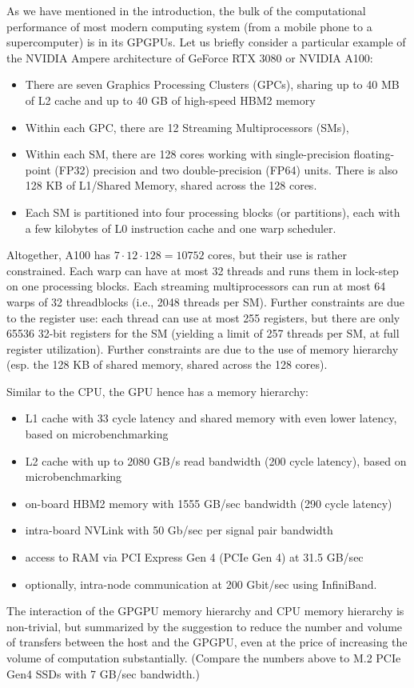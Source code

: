 As we have mentioned in the introduction, the bulk of the computational performance of most modern computing system (from a mobile phone to a supercomputer) is in its GPGPUs. Let us briefly consider a particular example of the NVIDIA Ampere architecture of GeForce RTX 3080 or NVIDIA A100:
\begin{itemize}
\item There are seven Graphics Processing Clusters (GPCs), sharing up to 40 MB of L2 cache and up to 40 GB of high-speed HBM2 memory 
\item Within each GPC, there are 12 Streaming Multiprocessors (SMs), 
\item Within each SM, there are 128 cores working with single-precision floating-point (FP32) precision and two double-precision (FP64) units. There is also 128 KB of L1/Shared Memory, shared across the 128 cores. 
\item Each SM is partitioned into four processing blocks (or partitions), each with a few kilobytes of L0 instruction cache and one warp scheduler.
\end{itemize}
Altogether, A100 has $7 \cdot 12 \cdot 128 = 10752$ cores, but their use is rather constrained. Each warp can have at most 32 threads and runs them in lock-step on one processing blocks. Each streaming multiprocessors can run at most 64 warps of 32 threadblocks (i.e., 2048 threads per SM). Further constraints are due to the register use: each thread can use at most 255 registers, but there are only 65536 32-bit registers for the SM (yielding a limit of 257 threads per SM, at full register utilization). Further constraints are due to the use of memory hierarchy (esp. the 128 KB of shared memory, shared across the 128 cores). 


Similar to the CPU, the GPU hence has a memory hierarchy:
\begin{itemize}
\item L1 cache with 33 cycle latency and shared memory with even lower latency, based on microbenchmarking \cite{9926299} 
\item L2 cache with up to 2080	 GB/s read bandwidth (200 cycle latency), based on microbenchmarking \cite{9926299} 
\item on-board HBM2 memory with 1555 GB/sec bandwidth (290 cycle latency)
\item intra-board NVLink with 50 Gb/sec per signal pair bandwidth
\item access to RAM via PCI Express Gen 4 (PCIe Gen 4) at 31.5 GB/sec
\item optionally, intra-node communication at 200 Gbit/sec using InfiniBand.
\end{itemize}
The interaction of the GPGPU memory hierarchy and CPU memory hierarchy is non-trivial, but summarized by the suggestion to reduce the number and volume of transfers between the host and the GPGPU, even at the price of increasing the volume of computation substantially. (Compare the numbers above to M.2 PCIe Gen4 SSDs with 7 GB/sec bandwidth.)

